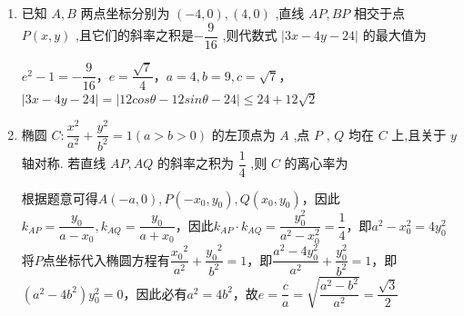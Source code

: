 \begin{enumerate}
\begin{enumerate}
\begin{jieda}
            \ps 本题涉及椭圆的第三定义：平面内的动点到两定点的斜率乘积等于常数$m < 0, m \neq -1$的点的轨迹是椭圆（刨除两定点）
            当$m = -1$对应于圆.
        \end{jieda}
        \item 已知 $A,B$ 两点坐标分别为 $\left( {-4,0}\right) ,\left( {4,0}\right)$ ,直线 ${AP},{BP}$ 相交于点 $P\left( {x,y}\right)$ ,且它们的斜率之积是$- \dfrac{9}{16}$ ,则代数式 $\left| {{3x} - {4y} - {24}}\right|$ 的最大值为
        \begin{jieda}
            $e^2 - 1 = - \dfrac{9}{16}$，$e = \dfrac{\sqrt{7}}{4}$，$a = 4, b = 9, c = \sqrt{7}$，$\left| {{3x} - {4y} - {24}}\right| = |12cos\theta - 12sin\theta - 24| \leq 24+12\sqrt{2}$
        \end{jieda}
        \item 椭圆 $C : \dfrac{{x}^{2}}{{a}^{2}} + \dfrac{{y}^{2}}{{b}^{2}} = 1\left( {a > b > 0}\right)$ 的左顶点为 $A$ ,点 $P$ , $Q$ 均在 $C$ 上,且关于 $y$ 轴对称. 若直线 ${AP},{AQ}$ 的斜率之积为 $\dfrac{1}{4}$ ,则 $C$ 的离心率为
        \begin{jieda}
            根据题意可得$A(-a, 0), P(-x_0, y_0), Q(x_0, y_0)$，因此$k_{AP} = \dfrac{y_0}{a-x_0}, k_{AQ} = \dfrac{y_0}{a+x_0}$，因此$k_{AP} \cdot k_{AQ} = \dfrac{y_0^2}{a^2-x_0^2} = \dfrac{1}{4}$，即$a^2-x_0^2 = 4y_0^2$ \\
            将$P$点坐标代入椭圆方程有$\dfrac{{x_0}^{2}}{{a}^{2}} + \dfrac{{y_0}^{2}}{{b}^{2}} = 1$，即$\dfrac{a^2-4y_0^2}{a^2}+\dfrac{y_0^2}{b^2} = 1$，即$(a^2-4b^2)y_0^2 = 0$，因此必有$a^2 = 4b^2$，故$e = \dfrac{c}{a} = \sqrt{\dfrac{a^2-b^2}{a^2}} = \dfrac{\sqrt{3}}{2}$
        \end{jieda}
    \end{enumerate}


\end{enumerate}
